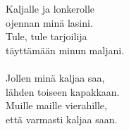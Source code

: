 
Kaljalle ja lonkerolle\\
ojennan minä lasini.\\
Tule, tule tarjoilija\\
täyttämään minun maljani.
\\ \hspace{10mm} \\

Jollen minä kaljaa saa,\\
lähden toiseen kapakkaan.\\
Muille maille vierahille,\\
että varmasti kaljaa saan.